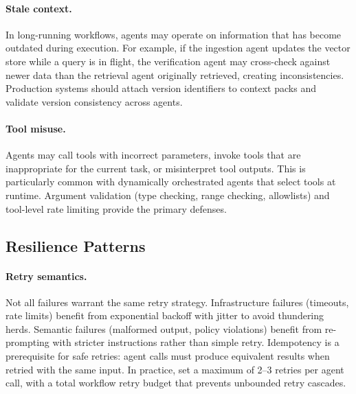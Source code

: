 \paragraph{Stale context.}
In long-running workflows, agents may operate on information that has become outdated during execution. For example, if the ingestion agent updates the vector store while a query is in flight, the verification agent may cross-check against newer data than the retrieval agent originally retrieved, creating inconsistencies. Production systems should attach version identifiers to context packs and validate version consistency across agents.

\paragraph{Tool misuse.}
Agents may call tools with incorrect parameters, invoke tools that are inappropriate for the current task, or misinterpret tool outputs. This is particularly common with dynamically orchestrated agents that select tools at runtime. Argument validation (type checking, range checking, allowlists) and tool-level rate limiting provide the primary defenses.

\subsection{Resilience Patterns}

\paragraph{Retry semantics.}
Not all failures warrant the same retry strategy. Infrastructure failures (timeouts, rate limits) benefit from exponential backoff with jitter to avoid thundering herds. Semantic failures (malformed output, policy violations) benefit from re-prompting with stricter instructions rather than simple retry. Idempotency is a prerequisite for safe retries: agent calls must produce equivalent results when retried with the same input. In practice, set a maximum of 2--3 retries per agent call, with a total workflow retry budget that prevents unbounded retry cascades.

